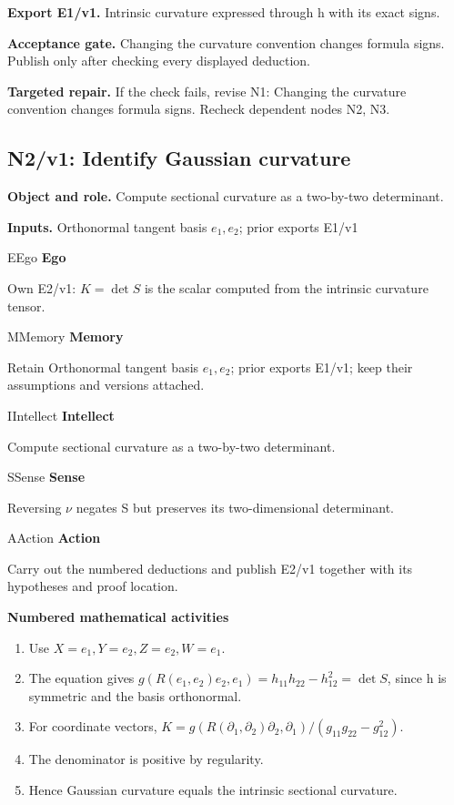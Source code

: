 \documentclass[preprint,12pt,aps,pra,showkeys,amsmath,amssymb,superscriptaddress,floatfix]{revtex4-2}
\theoremstyle{definition}
\theoremstyle{remark}
\newcommand{\mmfaculty}[3]{%
 \begin{mmfacultybox}{#1}{#2}
 {\sffamily\bfseries\color{MMBlue}#2}\par\smallskip #3
 \end{mmfacultybox}}
\newcommand{\field}[2]{\par\smallskip\noindent\textbf{#1.} #2\par}
\begin{document}
\field{Export E1/v1}{Intrinsic curvature expressed through h with its exact signs.}

\field{Acceptance gate}{Changing the curvature convention changes formula signs. Publish only
after checking every displayed deduction.}

\field{Targeted repair}{If the check fails, revise N1: Changing the curvature convention changes
formula signs. Recheck dependent nodes N2, N3.}

\clearpage

\subsection{N2/v1: Identify Gaussian curvature}

\field{Object and role}{Compute sectional curvature as a two-by-two determinant.}

\field{Inputs}{Orthonormal tangent basis \(e_{1},e_{2}\); prior exports E1/v1}

\mmfaculty{E}{Ego}{Own E2/v1: \(K=\operatorname{det} S\) is the scalar computed from the
intrinsic curvature tensor.}

\mmfaculty{M}{Memory}{Retain Orthonormal tangent basis \(e_{1},e_{2}\); prior exports E1/v1;
keep their assumptions and versions attached.}

\mmfaculty{I}{Intellect}{Compute sectional curvature as a two-by-two determinant.}

\mmfaculty{S}{Sense}{Reversing \(\nu\) negates S but preserves its two-dimensional
determinant.}

\mmfaculty{A}{Action}{Carry out the numbered deductions and publish E2/v1 together with its
hypotheses and proof location.}

\smallskip\noindent\textbf{Numbered mathematical activities}

\begin{enumerate}[label=N2.\arabic*,leftmargin=3.4em]

\item Use \(X=e_{1},Y=e_{2},Z=e_{2},W=e_{1}\).

\item The equation gives
\(g(R(e_{1},e_{2})e_{2},e_{1})=h_{11}h_{22}-h_{12}^{2}=\operatorname{det} S\),
since h is symmetric and the basis orthonormal.

\item For coordinate vectors,
\(K=g(R(\partial _{1},\partial _{2})\partial _{2},\partial _{1})/(g_{11}g_{22}-g_{12}^{2})\).

\item The denominator is positive by regularity.

\item Hence Gaussian curvature equals the intrinsic sectional curvature.

\end{enumerate}
\end{document}
